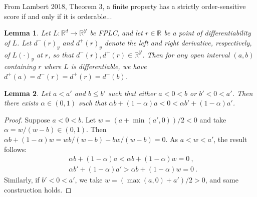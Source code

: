 \documentclass[11pt]{article}
\newcommand{\reals}{\mathbb{R}}
\newcommand{\Y}{\mathcal{Y}}
\newtheorem{lemma}{Lemma}
\begin{document}
From Lambert 2018, Theorem 3, a finite property has a strictly order-sensitive score if and only if it is orderable...

\begin{lemma}\label{lem:fplc-directional-deriv}
  Let $L:\reals^d \to \reals^\Y$ be FPLC, and let $r\in\reals$ be a point of differentiability of $L$.
  Let $d^-(r)_y$ and $d^+(r)_y$ denote the left and right derivative, respectively, of $L(\cdot)_y$ at $r$, so that $d^-(r),d^+(r)\in\reals^\Y$.
  Then for any open interval $(a,b)$ containing $r$ where $L$ is differentiable, we have
$d^+(a) = d^-(r) = d^+(r) = d^-(b)$.
\end{lemma}

\begin{lemma}\label{lem:simple-intervals}
  Let $a<a'$ and $b\leq b'$ such that either $a< 0 < b$ or $b' < 0 < a'$.
  Then there exists $\alpha \in (0,1)$ such that $\alpha b + (1-\alpha) a < 0 < \alpha b' + (1-\alpha) a'$.
\end{lemma}
\begin{proof}
  Suppose $a < 0 < b$.
  Let $w = (a + \min(a',0))/2 < 0$ and take $\alpha = w/(w-b) \in (0,1)$.
  Then $\alpha b + (1-\alpha) w = wb/(w-b) - bw/(w-b) = 0$.
  As $a < w < a'$, the result follows:
  \begin{align*}
    & \alpha b + (1-\alpha) a < \alpha b + (1-\alpha) w = 0~,
    \\
    & \alpha b' + (1-\alpha) a' > \alpha b + (1-\alpha) w = 0~.
  \end{align*}
  Similarly, if $b' < 0 < a'$, we take $w = (\max(a,0)+a')/2 > 0$, and same construction holds.
\end{proof}
\end{document}
